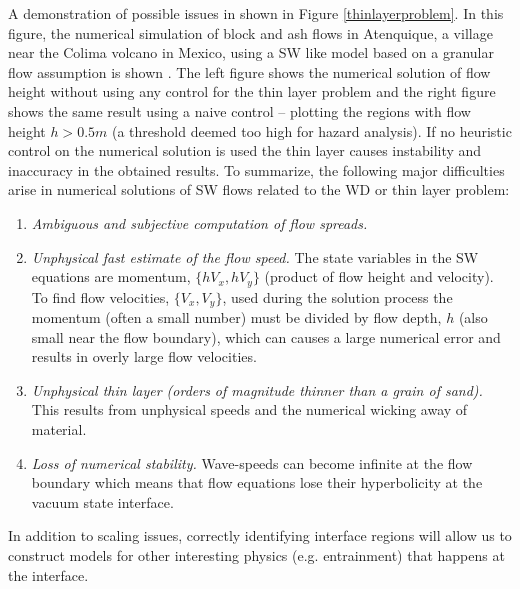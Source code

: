 \documentclass[review]{elsarticle}
\begin{document}
A demonstration of possible issues in shown in Figure \ref{thinlayerproblem}.
In this figure, the numerical simulation of block and ash flows in Atenquique,  a village near the Colima volcano in Mexico, using a SW like model 
based on a granular flow assumption is shown \cite{Patra2005}. The left figure shows the numerical solution of flow height without using any control for the thin layer problem 
and the right figure shows the same result  
using a naive control -- plotting the regions with flow height $h>0.5m$ (a threshold deemed too high for hazard analysis). 
If no heuristic control on the numerical solution is used the thin layer causes instability and 
inaccuracy in the obtained results.
To summarize, the following major difficulties arise in numerical solutions of SW flows related to the WD or thin layer problem:
\begin{enumerate}
        \item {\it Ambiguous and subjective computation of flow spreads.}
        \item \label{problemwicking}
             {\it Unphysical fast estimate of the flow speed.} The state variables in the  SW equations are momentum, $\{hV_x,hV_y\}$ (product of flow height and velocity). To find flow 
             velocities, $\{V_x,V_y\}$, used during the solution process the
             momentum (often a small number) must be divided by flow depth, $h$ (also small near the flow boundary),
              which can causes a large numerical error  and results in overly large flow velocities.
        \item \label{problemtoothin}
              {\it Unphysical thin layer (orders of magnitude thinner than a grain of sand).} This results from unphysical speeds and the numerical wicking away of material.
        \item \label{problemunstable}
             {\it Loss of numerical stability.} Wave-speeds can become infinite at the flow boundary which means that flow equations lose their hyperbolicity  
              at the vacuum state interface.
\end{enumerate}\label{thinprob}

In addition to scaling issues, correctly identifying 
 interface regions will allow us to construct models for  other interesting physics (e.g. entrainment) that happens at the interface.
\end{document}
